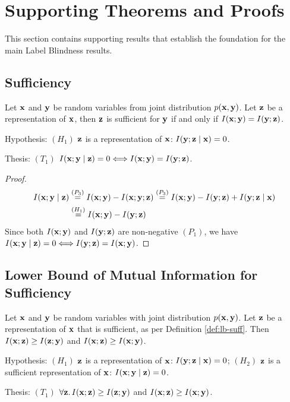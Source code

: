 \section{Supporting Theorems and Proofs}
\label{app:supporting}

This section contains supporting results that establish the foundation for the main Label Blindness results.

\subsection{Sufficiency}
\label{app:sufficiency}

\begin{proposition}
Let ${\mathbf{x}}$ and ${\mathbf{y}}$ be random variables from joint distribution $p({\mathbf{x}}, {\mathbf{y}})$. Let ${\mathbf{z}}$ be a representation of ${\mathbf{x}}$, then ${\mathbf{z}}$ is sufficient for ${\mathbf{y}}$ if and only if $I({\mathbf{x}} ; {\mathbf{y}})=I({\mathbf{y}} ; {\mathbf{z}})$.

Hypothesis: $\left(H_1\right)$ ${\mathbf{z}}$ is a representation of ${\mathbf{x}}$: $I({\mathbf{y}} ; {\mathbf{z}} \mid {\mathbf{x}})=0$.

Thesis: $\left(T_1\right)$ $I({\mathbf{x}} ; {\mathbf{y}} \mid {\mathbf{z}})=0 \Longleftrightarrow I({\mathbf{x}} ; {\mathbf{y}})=I({\mathbf{y}} ; {\mathbf{z}})$.
\label{sufficiency}
\end{proposition}

\begin{proof}
\begin{align*} I({\mathbf{x}} ; {\mathbf{y}} \mid {\mathbf{z}}) & \stackrel{\left(P_3\right)}{=} I({\mathbf{x}} ; {\mathbf{y}})-I({\mathbf{x}} ; {\mathbf{y}} ; {\mathbf{z}}) \stackrel{\left(P_3\right)}{=} I({\mathbf{x}} ; {\mathbf{y}})-I({\mathbf{y}} ; {\mathbf{z}})+I({\mathbf{y}} ; {\mathbf{z}} \mid {\mathbf{x}}) \\ & \stackrel{\left(H_1\right)}{=} I({\mathbf{x}} ; {\mathbf{y}})-I({\mathbf{y}} ; {\mathbf{z}}) \end{align*}
Since both $I({\mathbf{x}} ; {\mathbf{y}})$ and $I({\mathbf{y}} ; {\mathbf{z}})$ are non-negative $\left(P_1\right)$, we have $I({\mathbf{x}} ; {\mathbf{y}} \mid {\mathbf{z}})=0 \Longleftrightarrow I({\mathbf{y}} ; {\mathbf{z}})=I({\mathbf{x}} ; {\mathbf{y}})$.
\end{proof}

\subsection{Lower Bound of Mutual Information for Sufficiency}
\label{app:infobound}

\begin{lemma}
Let ${\mathbf{x}}$ and ${\mathbf{y}}$ be random variables with joint distribution $p({\mathbf{x}}, {\mathbf{y}})$. Let ${\mathbf{z}}$ be a representation of ${\mathbf{x}}$ that is sufficient, as per Definition \ref{def:lb-suff}. Then $I({\mathbf{x}};{\mathbf{z}}) \geq I({\mathbf{z}};{\mathbf{y}})$ and $I({\mathbf{x}};{\mathbf{z}}) \geq I({\mathbf{x}};{\mathbf{y}})$.

Hypothesis: $(H_1)$ ${\mathbf{z}}$ is a representation of ${\mathbf{x}}$: $I({\mathbf{y}} ; {\mathbf{z}} \mid {\mathbf{x}})=0$; $(H_2)$ ${\mathbf{z}}$ is a sufficient representation of ${\mathbf{x}}$: $I({\mathbf{x}}; {\mathbf{y}} \mid {\mathbf{z}})=0$.

Thesis: $(T_1)$ $\forall {\mathbf{z}}.\, I({\mathbf{x}};{\mathbf{z}}) \geq I({\mathbf{z}};{\mathbf{y}})$ and $I({\mathbf{x}};{\mathbf{z}}) \geq I({\mathbf{x}};{\mathbf{y}})$.
\label{infobound}
\end{lemma}

